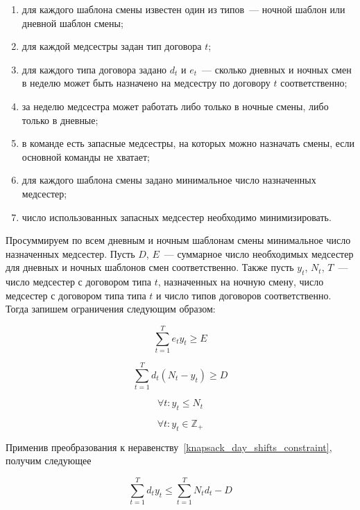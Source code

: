 \documentclass[times,specification,annotation]{itmo-student-thesis}
\begin{document}
\begin{enumerate}
    \item для каждого шаблона смены известен один из типов~--- ночной шаблон или дневной шаблон смены;
    \item для каждой медсестры задан тип договора $t$;
    \item для каждого типа договора задано $d_t$ и $e_t$~--- сколько дневных и ночных смен в неделю может быть назначено на медсестру по договору $t$ соответственно;
    \item за неделю медсестра может работать либо только в ночные смены, либо только в дневные;
    \item в команде есть запасные медсестры, на которых можно назначать смены, если основной команды не хватает;
    \item для каждого шаблона смены задано минимальное число назначенных медсестер;
    \item число использованных запасных медсестер необходимо минимизировать.
\end{enumerate}

Просуммируем по всем дневным и ночным шаблонам смены минимальное число назначенных медсестер.
Пусть $D$, $E$~--- суммарное число необходимых медсестер для дневных и ночных шаблонов смен соответственно.
Также пусть $y_t$, $N_t$, $T$~--- число медсестер с договором типа $t$, назначенных на ночную смену, число медсестер с договором типа типа $t$ и число типов договоров соответственно.
Тогда запишем ограничения следующим образом:

\begin{equation} \sum\limits^T_{t=1}{e_t y_t} \ge E \label{knapsack_night_shifts_constraint}\end{equation}

\begin{equation} \sum\limits^T_{t=1}{d_t \left( N_t - y_t \right)} \ge D \label{knapsack_day_shifts_constraint} \end{equation}

\begin{equation} \forall t : y_t \le N_t \end{equation}

\begin{equation} \forall t : y_t \in \mathbb{Z}_+ \end{equation}

Применив преобразования к неравенству~\eqref{knapsack_day_shifts_constraint}, получим следующее

\begin{equation} \sum\limits^T_{t=1}{d_t y_t} \le \sum\limits^T_{t=1}{N_t d_t} - D \label{knapsack_day_shifts_constraint_improved}\end{equation}
\end{document}
